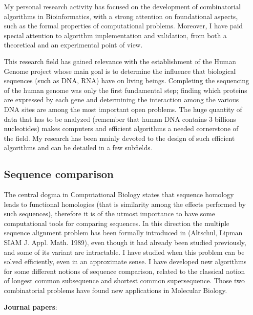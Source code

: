\documentclass[11pt,a4paper,roman]{moderncv}
\begin{document}
My personal research activity has focused on the development of combinatorial
algorithms in Bioinformatics, with a strong attention on foundational aspects,
such as the formal properties of computational problems.
Moreover, I have paid special attention to algorithm implementation and validation, from both a theoretical and an experimental point of view.


This research field has gained relevance with the establishment of the
Human Genome project whose main goal is to determine the influence that
biological sequences (such as DNA, RNA) have on living beings.
Completing the sequencing of the human genome was only the first
fundamental step; finding which proteins are expressed by each gene and
determining the interaction among the various DNA sites are among the
most important open problems. The huge quantity of data that has to be
analyzed (remember that human DNA contains 3 billions nucleotides) makes
computers and efficient algorithms a needed cornerstone of the field.
My research has been mainly devoted to the design of such
efficient algorithms and can be detailed in a few subfields.

\subsection{Sequence comparison}\label{sequence-comparison}

The central dogma in Computational Biology states that sequence homology
leads to functional homologies (that is similarity among the effects
performed by such sequences), therefore it is of the utmost importance
to have some computational tools for comparing sequences. In this
direction the multiple sequence alignment problem has been formally
introduced in (Altschul, Lipman SIAM J. Appl. Math. 1989), even though
it had already been studied previously, and some of its variant are
intractable. I have studied when this problem can be solved efficiently,
even in an approximate sense. I have developed new algorithms for some
different notions of sequence comparison, related to the classical
notion of longest common subsequence and shortest common supersequence.
Those two combinatorial problems have found new applications in
Molecular Biology.

\textbf{Journal
papers}:~\cite{baaijensComputationalGraphPangenomics2022,DBLP:journals/ipl/BonizzoniVDP10,DBLP:journals/tcbb/BonizzoniVDFRV07,DBLP:journals/informs/JustV04,DBLP:journals/dam/BonizzoniVM01,DBLP:journals/tcs/BonizzoniV01}
\end{document}
